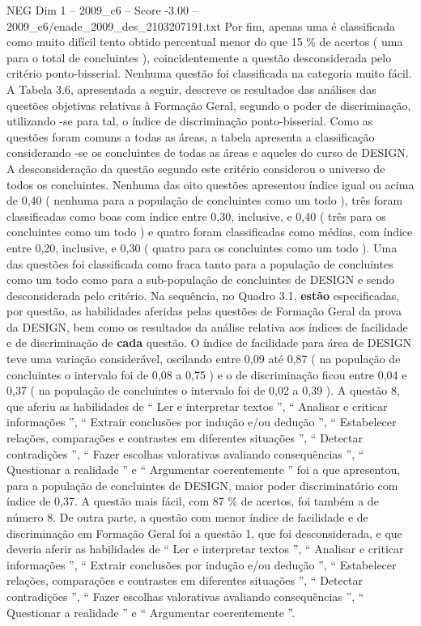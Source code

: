 \begin{textsample}{NEG Dim 1 – 2009\_c6 – Score -3.00 – 2009\_c6/enade\_2009\_des\_2103207191.txt}
Por fim, apenas uma é classificada como muito difícil tento obtido percentual menor do que 15 \% de acertos ( uma para o total de concluintes ), coincidentemente a questão desconsiderada pelo critério ponto-bisserial.
Nenhuma questão foi classificada na categoria muito fácil.
A Tabela 3.6, apresentada a seguir, descreve os resultados das análises das questões objetivas relativas à Formação Geral, segundo o poder de discriminação, utilizando -se para tal, o índice de discriminação ponto-bisserial.
Como as questões foram comuns a todas as áreas, a tabela apresenta a classificação considerando -se os concluintes de todas as áreas e aqueles do curso de DESIGN.
A desconsideração da questão segundo este critério considerou o universo de todos os concluintes.
Nenhuma das oito questões apresentou índice igual ou acima de 0,40 ( nenhuma para a população de concluintes como um todo ), três foram classificadas como boas com índice entre 0,30, inclusive, e 0,40 ( três para os concluintes como um todo ) e quatro foram classificadas como médias, com índice entre 0,20, inclusive, e 0,30 ( quatro para os concluintes como um todo ).
Uma das questões foi classificada como fraca tanto para a população de concluintes como um todo como para a sub-população de concluintes de DESIGN e sendo desconsiderada pelo critério.
Na sequência, no Quadro 3.1, \textbf{estão} especificadas, por questão, as habilidades aferidas pelas questões de Formação Geral da prova da DESIGN, bem como os resultados da análise relativa aos índices de facilidade e de discriminação de \textbf{cada} questão.
O índice de facilidade para área de DESIGN teve uma variação considerável, oscilando entre 0,09 até 0,87 ( na população de concluintes o intervalo foi de 0,08 a 0,75 ) e o de discriminação ficou entre 0,04 e 0,37 ( na população de concluintes o intervalo foi de 0,02 a 0,39 ).
A questão 8, que aferiu as habilidades de “ Ler e interpretar textos ”, “ Analisar e criticar informações ”, “ Extrair conclusões por indução e/ou dedução ”, “ Estabelecer relações, comparações e contrastes em diferentes situações ”, “ Detectar contradições ”, “ Fazer escolhas valorativas avaliando consequências ”, “ Questionar a realidade ” e “ Argumentar coerentemente ” foi a que apresentou, para a população de concluintes de DESIGN, maior poder discriminatório com índice de 0,37.
A questão mais fácil, com 87 \% de acertos, foi também a de número 8.
De outra parte, a questão com menor índice de facilidade e de discriminação em Formação Geral foi a questão 1, que foi desconsiderada, e que deveria aferir as habilidades de “ Ler e interpretar textos ”, “ Analisar e criticar informações ”, “ Extrair conclusões por indução e/ou dedução ”, “ Estabelecer relações, comparações e contrastes em diferentes situações ”, “ Detectar contradições ”, “ Fazer escolhas valorativas avaliando consequências ”, “ Questionar a realidade ” e “ Argumentar coerentemente ”.

\end{textsample}
